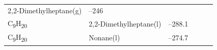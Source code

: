 \documentclass[
]{book}
\theoremstyle{definition}
\theoremstyle{definition}
\theoremstyle{definition}
\theoremstyle{remark}
\begin{document}
\begin{longtable}[]{@{}llllll@{}}
\begin{minipage}[t]{0.17\columnwidth}
2,2-Dimethylheptane(g)\strut
\end{minipage} & \begin{minipage}[t]{0.15\columnwidth}\raggedright
--246\strut
\end{minipage} & \begin{minipage}[t]{0.15\columnwidth}\raggedright
\strut
\end{minipage} & \begin{minipage}[t]{0.14\columnwidth}\raggedright
\strut
\end{minipage} & \begin{minipage}[t]{0.14\columnwidth}\raggedright
\strut
\end{minipage}\tabularnewline
\begin{minipage}[t]{0.07\columnwidth}\raggedright
C\textsubscript{9}H\textsubscript{20}\strut
\end{minipage} & \begin{minipage}[t]{0.17\columnwidth}\raggedright
2,2-Dimethylheptane(l)\strut
\end{minipage} & \begin{minipage}[t]{0.15\columnwidth}\raggedright
--288.1\strut
\end{minipage} & \begin{minipage}[t]{0.15\columnwidth}\raggedright
\strut
\end{minipage} & \begin{minipage}[t]{0.14\columnwidth}\raggedright
\strut
\end{minipage} & \begin{minipage}[t]{0.14\columnwidth}\raggedright
\strut
\end{minipage}\tabularnewline
\begin{minipage}[t]{0.07\columnwidth}\raggedright
C\textsubscript{9}H\textsubscript{20}\strut
\end{minipage} & \begin{minipage}[t]{0.17\columnwidth}\raggedright
Nonane(l)\strut
\end{minipage} & \begin{minipage}[t]{0.15\columnwidth}\raggedright
--274.7\strut
\end{minipage} & \begin{minipage}[t]{0.15\columnwidth}\raggedright
\strut
\end{minipage} & \begin{minipage}[t]{0.14\columnwidth}\raggedright
\strut
\end{minipage} & \begin{minipage}[t]{0.14\columnwidth}\raggedright

\end{minipage}
\end{longtable}
\end{document}
